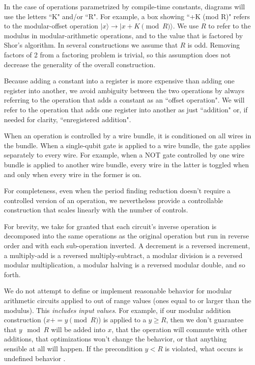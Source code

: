 \documentclass[twocolumn,longbibliography]{quantumarticle}
\begin{document}
In the case of operations parametrized by compile-time constants, diagrams will use the letters ``K" and/or ``R".
For example, a box showing ``+K (mod R)" refers to the modular-offset operation $|x\rangle \rightarrow |x+K \pmod{R}\rangle$.
We use $R$ to refer to the modulus in modular-arithmetic operations, and to the value that is factored by Shor's algorithm.
In several constructions we assume that $R$ is odd.
Removing factors of 2 from a factoring problem is trivial, so this assumption does not decrease the generality of the overall construction.

Because adding a constant into a register is more expensive than adding one register into another, we avoid ambiguity between the two operations by always referring to the operation that adds a constant as an ``offset operation".
We will refer to the operation that adds one register into another as just ``addition" or, if needed for clarity, ``enregistered addition".

When an operation is controlled by a wire bundle, it is conditioned on all wires in the bundle.
When a single-qubit gate is applied to a wire bundle, the gate applies separately to every wire.
For example, when a NOT gate controlled by one wire bundle is applied to another wire bundle, every wire in the latter is toggled when and only when every wire in the former is on.

For completeness, even when the period finding reduction doesn't require a controlled version of an operation, we nevertheless provide a controllable construction that scales linearly with the number of controls.

For brevity, we take for granted that each circuit's inverse operation is decomposed into the same operations as the original operation but run in reverse order and with each sub-operation inverted.
A decrement is a reversed increment, a multiply-add is a reversed multiply-subtract, a modular division is a reversed modular multiplication, a modular halving is a reversed modular double, and so forth.

We do not attempt to define or implement reasonable behavior for modular arithmetic circuits applied to out of range values (ones equal to or larger than the modulus).
This {\em includes input values}.
For example, if our modular addition construction ($x \mathrel{{+}{=}} y \pmod{R}$) is applied to a $y \geq R$, then we don't guarantee that $y \mod R$ will be added into $x$, that the operation will commute with other additions, that optimizations won't change the behavior, or that anything sensible at all will happen.
If the precondition $y < R$ is violated, what occurs is undefined behavior \cite{c11}.
\end{document}
